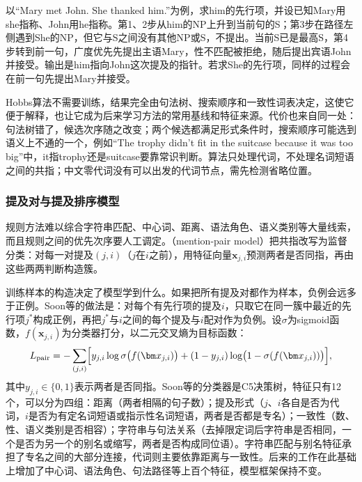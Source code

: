 以“Mary met John. She thanked him.”为例，求him的先行项，并设已知Mary用she指称、John用he指称。第1、2步从him的NP上升到当前句的S；第3步在路径左侧遇到She的NP，但它与S之间没有其他NP或S，不提出。当前S已是最高S，第4步转到前一句，广度优先先提出主语Mary，性不匹配被拒绝，随后提出宾语John并接受。输出是him指向John这次提及的指针。若求She的先行项，同样的过程会在前一句先提出Mary并接受。

Hobbs算法不需要训练，结果完全由句法树、搜索顺序和一致性词表决定，这使它便于解释，也让它成为后来学习方法的常用基线和特征来源。代价也来自同一处：句法树错了，候选次序随之改变；两个候选都满足形式条件时，搜索顺序可能选到语义上不通的一个，例如“The trophy didn't fit in the suitcase because it was too big”中，it指trophy还是suitcase要靠常识判断。算法只处理代词，不处理名词短语之间的共指；中文零代词没有可以出发的代词节点，需先检测省略位置。

\subsubsection{提及对与提及排序模型}
\label{sec:nlp-analysis-mention-ranking}

规则方法难以综合字符串匹配、中心词、距离、语法角色、语义类别等大量线索，而且规则之间的优先次序要人工调定。（mention-pair model）把共指改写为监督分类：对每一对提及$(j,i)$（$j$在$i$之前），用特征向量$\bm x_{j,i}$预测两者是否同指，再由这些两两判断构造簇。

训练样本的构造决定了模型学到什么。如果把所有提及对都作为样本，负例会远多于正例。Soon等的做法是：对每个有先行项的提及$i$，只取它在同一簇中最近的先行项$j^*$构成正例，再把$j^*$与$i$之间的每个提及与$i$配对作为负例。设$\sigma$为sigmoid函数，$f(\bm x_{j,i})$为分类器打分，以二元交叉熵为目标函数：
\begin{equation}
  L_{\mathrm{pair}}=-\sum_{(j,i)}\Bigl[y_{j,i}\log\sigma\bigl(f(\bm x_{j,i})\bigr)
   +(1-y_{j,i})\log\bigl(1-\sigma(f(\bm x_{j,i}))\bigr)\Bigr],
  \label{eq:nlp-analysis-mention-pair}
\end{equation}
其中$y_{j,i}\in\{0,1\}$表示两者是否同指。Soon等的分类器是C5决策树，特征只有12个，可以分为四组：距离（两者相隔的句子数）；提及形式（$j$、$i$各自是否为代词，$i$是否为有定名词短语或指示性名词短语，两者是否都是专名）；一致性（数、性、语义类别是否相容）；字符串与句法关系（去掉限定词后字符串是否相同，一个是否为另一个的别名或缩写，两者是否构成同位语）。字符串匹配与别名特征承担了专名之间的大部分连接，代词则主要依靠距离与一致性。后来的工作在此基础上增加了中心词、语法角色、句法路径等上百个特征，模型框架保持不变。

